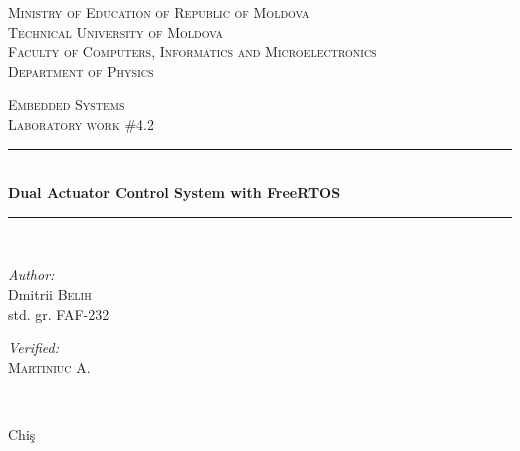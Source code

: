 \documentclass[12pt]{article}
\begin{document}
\begin{titlepage}
	\thispagestyle{empty}

	\begin{center}
		\textsc{\large Ministry of Education of Republic of Moldova}\\[0.5cm]
		\textsc{\large Technical University of Moldova}\\[0.5cm]
		\textsc{\large Faculty of Computers, Informatics and Microelectronics}\\[0.5cm]
		\textsc{\large Department of Physics}\\[1.2cm]
	\end{center}

	\vspace{25 mm}

	\begin{center}
		\textsc{\Large Embedded Systems}\\[0.5cm]
		\textsc{\large Laboratory work \#4.2}\\[0.5cm]

		\newcommand{\HRule}{\rule{\linewidth}{0.5mm}}
		\vspace{10 mm}
		\HRule \\[0.4cm]
		{ \LARGE \bfseries Dual Actuator Control System with FreeRTOS}\\[0.4cm]
		\HRule \\[1.5cm]
	\end{center}

	\vspace{10mm}

	\begin{minipage}[t]{0.4\textwidth}
		\begin{flushleft} \large
			\emph{Author:} \\
			Dmitrii \textsc{Belih}\\
			std. gr. FAF-232
		\end{flushleft}
	\end{minipage}
	\hfill
	\begin{minipage}[t]{0.4\textwidth}
		\begin{flushright} \large
			\emph{Verified:} \\
			\textsc{Martiniuc} A.\\
		\end{flushright}
	\end{minipage}\\[3cm]

	\vspace{5 mm}
	\begin{center}
		\large Chi\c{s} \\[0.5cm]
	\end{center}

	\vfill
\end{titlepage}
\end{document}
